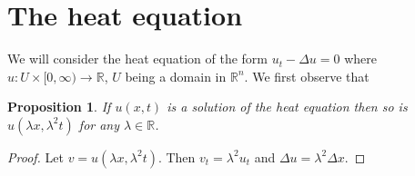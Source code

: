\documentclass{article}
\theoremstyle{plain}
\numberwithin{thm}{section}
\theoremstyle{plain}
\newtheorem{prop}{Proposition}
\numberwithin{prop}{section}
\theoremstyle{definition}
\numberwithin{defn}{section}
\theoremstyle{remark}
\numberwithin{equation}{section}
\begin{document}
\section{The heat equation}\label{s27}
We will consider the heat equation of the form $u_t - \Delta u = 0$ where $u: U \times [0, \infty) \rightarrow
\mathbb{R}$, $U$ being a domain in $\mathbb{R}^n$. We first observe that
\begin{prop}\label{s27p1}
If $u(x, t)$ is a solution of the heat equation then so is $u(\lambda x, \lambda^2 t)$ for any $\lambda \in 
\mathbb{R}$.
\end{prop}
\begin{proof}
Let $v = u(\lambda x, \lambda^2 t)$. Then $v_t = \lambda^2 u_t$ and $\Delta u = \lambda^2 \Delta x$.
\end{proof}
\end{document}
